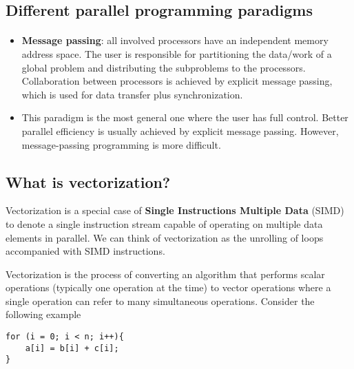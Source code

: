 \documentclass[%
oneside,                 %
final,                   %
10pt]{article}
\begin{document}
\noindent


\subsection*{Different parallel programming paradigms}

\paragraph{}

\begin{itemize}
\item \textbf{Message passing}:  all involved processors have an independent memory address space. The user is responsible for  partitioning the data/work of a global problem and distributing the  subproblems to the processors. Collaboration between processors is achieved by explicit message passing, which is used for data transfer plus synchronization.

\item This paradigm is the most general one where the user has full control. Better parallel efficiency is usually achieved by explicit message passing. However, message-passing programming is more difficult.
\end{itemize}

\noindent



\subsection*{What is vectorization?}
Vectorization is a special
case of \textbf{Single Instructions Multiple Data} (SIMD) to denote a single
instruction stream capable of operating on multiple data elements in
parallel. 
We can think of vectorization as the unrolling of loops accompanied with SIMD instructions.

Vectorization is the process of converting an algorithm that performs scalar operations
(typically one operation at the time) to vector operations where a single operation can refer to many simultaneous operations.
Consider the following example




\begin{verbatim}
for (i = 0; i < n; i++){
    a[i] = b[i] + c[i];
}

\end{verbatim}
\end{document}
